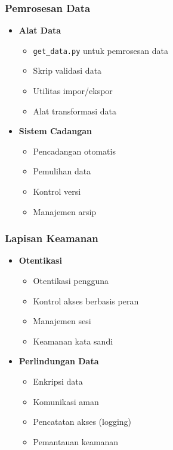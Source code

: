 \documentclass[12pt,a4paper]{article}
\begin{document}
\subsubsection{Pemrosesan Data}
\begin{itemize}
    \item \textbf{Alat Data}
    \begin{itemize}
        \item \texttt{get\_data.py} untuk pemrosesan data
        \item Skrip validasi data
        \item Utilitas impor/ekspor
        \item Alat transformasi data
    \end{itemize}
    
    \item \textbf{Sistem Cadangan}
    \begin{itemize}
        \item Pencadangan otomatis
        \item Pemulihan data
        \item Kontrol versi
        \item Manajemen arsip
    \end{itemize}
\end{itemize}

\subsubsection{Lapisan Keamanan}
\begin{itemize}
    \item \textbf{Otentikasi}
    \begin{itemize}
        \item Otentikasi pengguna
        \item Kontrol akses berbasis peran
        \item Manajemen sesi
        \item Keamanan kata sandi
    \end{itemize}
    
    \item \textbf{Perlindungan Data}
    \begin{itemize}
        \item Enkripsi data
        \item Komunikasi aman
        \item Pencatatan akses (logging)
        \item Pemantauan keamanan
    \end{itemize}
\end{itemize}
\end{document}
